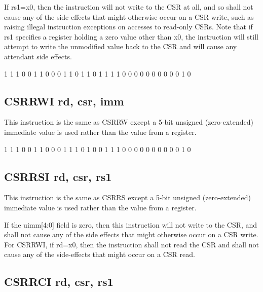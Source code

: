 If rs1=x0, then the instruction will not write 
to the CSR at all, and so shall not cause any of the side effects that 
might otherwise occur on a CSR write, such as raising illegal instruction 
exceptions on accesses to read-only CSRs. Note that if rs1 specifies a 
register holding a zero value other than x0, the instruction will still 
attempt to write the unmodified value back to the CSR and will cause any 
attendant side effects.~\cite[p.~22]{rvismv1v22:2017}

{1 1 1 0 0 1 1}				%
{0 0 0 1 1}					%
{0 1 1}						%
{0 1 1 1 1}					%
{0 0 0 0 0 0 0 0 0 0 1 0}	%



\subsection{CSRRWI rd, csr, imm}

This instruction is the same as CSRRW except a 5-bit unsigned (zero-extended)
immediate value is used rather than the value from a register.

{1 1 1 0 0 1 1}				%
{0 0 0 1 1}					%
{1 0 1}						%
{0 0 1 1 1}					%
{0 0 0 0 0 0 0 0 0 0 1 0}	%

\subsection{CSRRSI rd, csr, rs1}

This instruction is the same as CSRRS except a 5-bit unsigned (zero-extended)
immediate value is used rather than the value from a register.

If the uimm[4:0] field is zero, then this instruction will not
write to the CSR, and shall not cause any of the side effects that 
might otherwise occur on a CSR write. For CSRRWI, if rd=x0, then 
the instruction shall not read the CSR and shall not cause any
of the side-effects that might occur on a CSR 
read.~\cite[p.~22]{rvismv1v22:2017}


\subsection{CSRRCI rd, csr, rs1}

